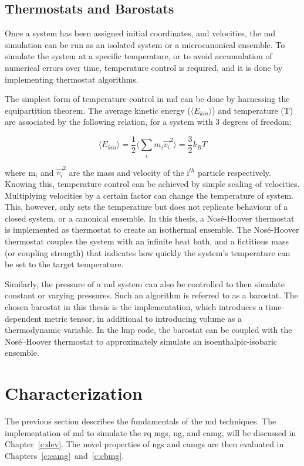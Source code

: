 \subsection{Thermostats and Barostats}
Once a system has been assigned initial coordinates, and velocities, the \gls{md} simulation can be run as an isolated system or a microcanonical ensemble. To simulate the system at a specific temperature, or to avoid accumulation of numerical errors over time, temperature control is required, and it is done by implementing thermostat algorithms. \par

The simplest form of temperature control in \gls{md} can be done by harnessing the equipartition theorem. The average kinetic energy ($\langle E_{kin} \rangle $) and temperature (T) are associated by the following relation, for a system with 3 degrees of freedom:

\begin{equation}
\langle E_{kin} \rangle = \frac{1}{2} \langle \sum_{i} m_i \vec{v_i}^2 \rangle = \frac{3}{2} k_B T
\end{equation}

where m$_i$ and $\vec{v_i}^2$ are the mass and velocity of the i$^{th}$ particle respectively. Knowing this, temperature control can be achieved by simple scaling of velocities. Multiplying velocities by a certain factor can change the temperature of system. This, however, only sets the temperature but does not replicate behaviour of a closed system, or a canonical ensemble. In this thesis, a Nos\'e-Hoover thermostat \cite{Hoover1985} is implemented as thermostat to create an isothermal ensemble. The Nos\'e-Hoover thermostat couples the system with an infinite heat bath, and a fictitious mass (or coupling strength) that indicates how quickly the system's temperature can be set to the target temperature. \par
 
Similarly, the pressure of a \gls{md} system can also be controlled to then simulate constant or varying pressures. Such an algorithm is referred to as a barostat. The chosen barostat in this thesis is the \textcite{Parrinello1980} implementation, which introduces a time-dependent metric tensor, in additional to introducing volume as a thermodynamic variable. In the \gls{lmp} code, the barostat can be coupled with the Nos\'e–Hoover thermostat to approximately simulate an isoenthalpic-isobaric ensemble. \par

\section{Characterization}
The previous section describes the fundamentals of the \gls{md} techniques. The implementation of \gls{md} to simulate the \gls{rq} \gls{mg}s, \gls{ng}, and \gls{camg}, will be discussed in Chapter~\ref{c:dev}. The novel properties of \gls{ng}s and \gls{camg}s are then evaluated in Chapters~\ref{c:camg}~and~\ref{c:cbmg}. \par

